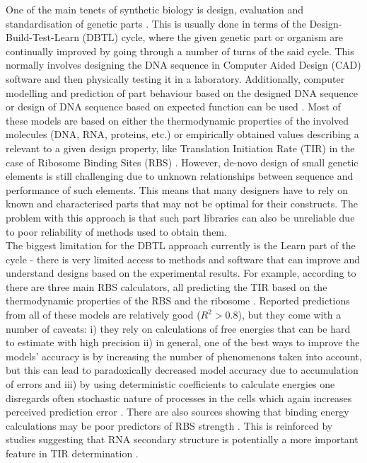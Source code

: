 \documentclass{article}
\begin{document}
One of the main tenets of synthetic biology is design, evaluation and standardisation of genetic parts \cite{Brophy2014,Canton2008,Stanton2014}.
This is usually done in terms of the Design-Build-Test-Learn (DBTL) cycle, where the given genetic part or organism are continually improved by going through a number of turns of the said cycle.
This normally involves designing the DNA sequence in Computer Aided Design (CAD) software and then physically testing it in a laboratory. 
Additionally, computer modelling and prediction of part behaviour based on the designed DNA sequence or design of DNA sequence based on expected function can be used \cite{Yeoh2019,Nielsen2016}.
Most of these models are based on either the thermodynamic properties of the involved molecules (DNA, RNA, proteins, etc.) or empirically obtained values describing a relevant to a given design property, like Translation Initiation Rate (TIR) in the case of Ribosome Binding Sites (RBS) \cite{Xia1998,Chen2013,Reeve2014}.
However, de-novo design of small genetic elements is still challenging due to unknown relationships between sequence and performance of such elements. 
This means that many designers have to rely on known and characterised parts that may not be optimal for their constructs.
The problem with this approach is that such part libraries can also be unreliable due to poor reliability of methods used to obtain them.\\
The biggest limitation for the DBTL approach currently is the Learn part of the cycle - there is very limited access to methods and software that can improve and understand designs based on the experimental results.
For example, according to  \textcite{Reeve2014} there are three main RBS calculators, all predicting the TIR based on the thermodynamic properties of the RBS and the ribosome \cite{Seo2013,Na2010,Salis2009}. 
Reported predictions from all of these models are relatively good ($R^2 >0.8$), 
but they come with a number of caveats: i) they rely on calculations of free energies that can be hard to estimate with high precision ii) in general, one of the best ways to improve the models' accuracy is by increasing the number of phenomenons taken into account, but this can lead to paradoxically decreased model accuracy due to accumulation of errors \cite{EspahBorujeni2016} and iii) by using deterministic coefficients to calculate energies one disregards often stochastic nature of processes in the cells which again increases perceived prediction error \cite{Goss1998}. 
There are also sources showing that binding energy calculations may be poor predictors of RBS strength \cite{Saito2020,Sherer1980}. This is reinforced by studies suggesting that RNA secondary structure is potentially a more important feature in TIR determination \cite{DESMIT1994,EspahBorujeni2016}.\\
\end{document}
